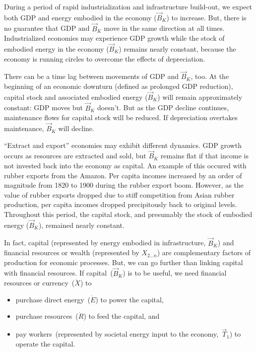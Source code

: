 During a period of rapid industrialization and infrastructure build-out, 
we expect both GDP and energy embodied in the economy ($\vec{B}_{K}$)
to increase.
But, there is no guarantee that GDP and $\vec{B}_{K}$ move 
in the same direction at all times.
Industrialized economies may experience GDP growth while 
the stock of embodied energy in the economy ($\vec{B}_{K}$) remains nearly constant,
because the economy is running circles to overcome the effects of depreciation.

There can be a time lag between movements of GDP and $\vec{B}_{K}$, too.
At the beginning of an economic downturn (defined as prolonged GDP reduction),
capital stock and associated embodied energy ($\vec{B}_{K}$) will remain approximately constant:
GDP moves but $\vec{B}_{K}$ doesn't.
But as the GDP decline continues, 
maintenance flows for capital stock will be reduced.
If depreciation overtakes maintenance, $\vec{B}_{K}$ will decline. 


``Extract and export'' economies may exhibit different dynamics.
GDP growth occurs as resources are extracted and sold, 
but $\vec{B}_{K}$ remains flat if that income is not 
invested back into the economy as capital. 
An example of this occured with rubber exports from the Amazon.
Per capita incomes increased by an order of magnitude 
from 1820 to 1900 during the rubber export boom. 
However, as the value of rubber exports dropped 
due to stiff competition from Asian rubber production, 
per capita incomes dropped precipitously back to original levels. 
Throughout this period, the capital stock, 
and presumably the stock of embodied energy ($\vec{B}_{K}$), 
remained nearly constant.\cite{bunker1984modes}

In fact, capital (represented by energy embodied in infrastructure, $\vec{B}_{K}$) and 
financial resources or wealth (represented by $X_{2 \ldots n}$) 
are complementary factors of production for economic processes. 
But, we can go further than linking capital with financial resources.
If capital~($\vec{B}_{K}$) is to be useful, we need financial resources
or currency~($\dot{X}$) to 
\begin{itemize}
	\item{purchase direct energy~($\dot{E}$) to power the capital,}
	
	\item{purchase resources~($\dot{R}$) to feed the capital, and}
	
	\item{pay workers~(represented 
	by societal energy input to the economy,~$\vec{T}_{1}$) 
	to operate the capital.}
\end{itemize}

